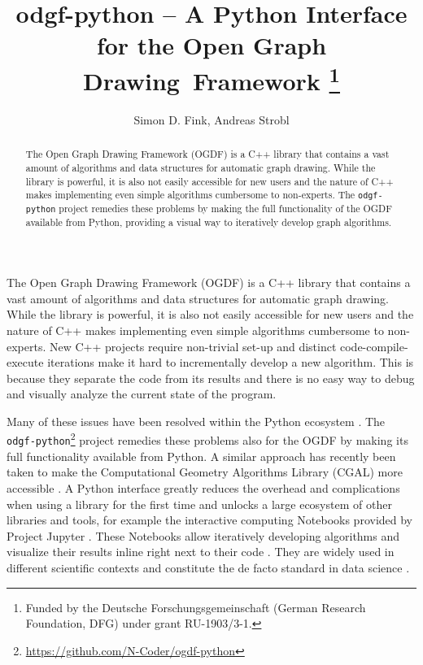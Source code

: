 \documentclass{llncs}
\title{odgf-python -- A Python Interface for the Open Graph Drawing~Framework%
  \thanks{Funded by the Deutsche Forschungsgemeinschaft (German Research Foundation, DFG) under grant RU-1903/3-1.}
}
\author{Simon D. Fink\orcidID{0000-0002-2754-1195}, Andreas Strobl}
\institute{Faculty for Mathematics and Computer Science, University of Passau,\\Passau, Germany\\\email{\{finksim,strobland\}@fim.uni-passau.de}}
\date{}
\begin{document}
\maketitle

\begin{abstract}
The Open Graph Drawing Framework (OGDF) is a C++ library that contains a vast amount of algorithms and data structures for automatic graph drawing.
While the library is powerful, it is also not easily accessible for new users and the nature of C++ makes implementing even simple algorithms cumbersome to non-experts.
The \texttt{odgf-python} project remedies these problems by making the full functionality of the OGDF available from Python, providing a visual way to iteratively develop graph algorithms.

\end{abstract}


The Open Graph Drawing Framework (OGDF) \cite{cgj-tog-13} is a C++ library that contains a vast amount of algorithms and data structures for
automatic graph drawing.
While the library is powerful, it is also not easily accessible for new users and the nature of C++ makes implementing even simple algorithms cumbersome to non-experts.
New C++ projects require non-trivial set-up and distinct code-compile-execute iterations make it hard to incrementally develop a new algorithm.
This is because they separate the code from its results and there is no easy way to debug and visually analyze the current state of the program.

Many of these issues have been resolved within the Python ecosystem \cite{per-tcc-21}.
The \texttt{odgf-python}\footnote{\url{https://github.com/N-Coder/ogdf-python}} project remedies these problems also for the OGDF by making its full functionality available from Python.
A similar approach has recently been taken to make the Computational Geometry Algorithms Library (CGAL) more accessible \cite{gfh-cmm-22}.
A Python interface greatly reduces the overhead and complications when using a library for the first time and unlocks a large ecosystem
of other libraries and tools, for example the interactive computing Notebooks provided by Project Jupyter \cite{krp-jn-16}.
These Notebooks allow iteratively developing algorithms and visualize their results inline right next to their code \cite{per-tcc-21}.
They are widely used in different scientific contexts and constitute the de facto standard in data science \cite{per-wji-18}.
\end{document}
